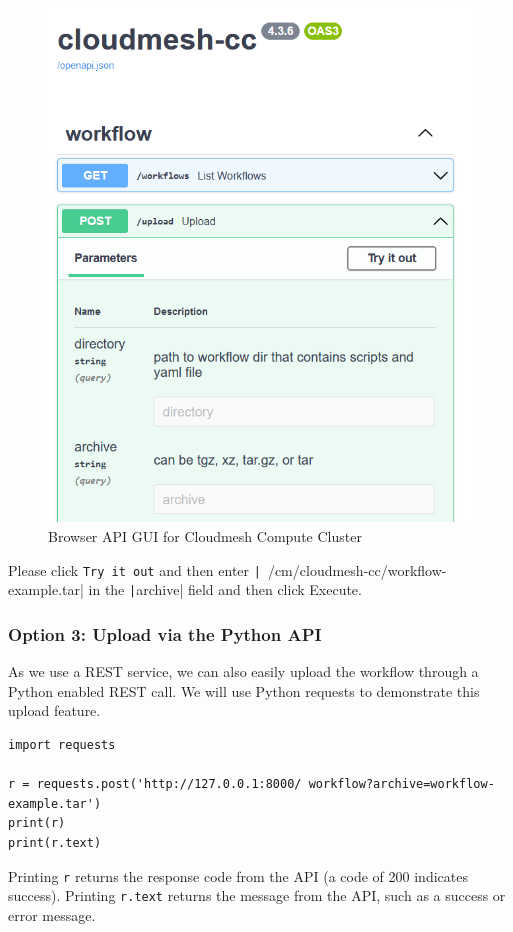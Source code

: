 \begin{figure}
\centering
\includegraphics[width=0.7\columnwidth]{images/upload_api.png}
\caption{Browser API GUI for Cloudmesh Compute Cluster}
\end{figure}

Please click \texttt{Try\ it\ out} and then enter \newline
\texttt|~/cm/cloudmesh-cc/workflow-example.tar| in the
\texttt|archive| field and then click Execute.

\subsubsection{Option 3: Upload via the Python
API}\label{option-3-upload-via-the-python-api}

As we use a REST service, we can also easily upload the workflow through
a Python enabled REST call. We will use Python requests to demonstrate
this upload feature.

\smallskip
\begin{verbatim}
import requests

r = requests.post('http://127.0.0.1:8000/ workflow?archive=workflow-example.tar')
print(r)
print(r.text)
\end{verbatim}
\smallskip

Printing \texttt{r} returns the response code from the API (a code of
200 indicates success). Printing \texttt{r.text} returns the message
from the API, such as a success or error message.

